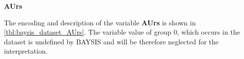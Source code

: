 \Large
\centerline{\textbf{AUrs}}
\normalsize
The encoding and description of the variable \textbf{AUrs} is shown in \autoref{tbl:baysis_dataset_AUrs}. The variable value of group 0, which occurs in the dataset is undefined by BAYSIS and will be therefore neglected for the interpretation.

